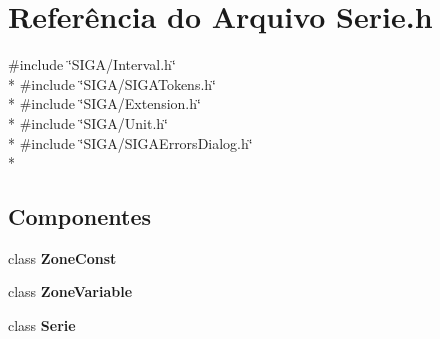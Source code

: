 \section{Referência do Arquivo Serie.\+h}
\label{_s_i_g_a_2_serie_8h}
{\ttfamily \#include \char`\"{}S\+I\+G\+A/\+Interval.\+h\char`\"{}}\\*
{\ttfamily \#include \char`\"{}S\+I\+G\+A/\+S\+I\+G\+A\+Tokens.\+h\char`\"{}}\\*
{\ttfamily \#include \char`\"{}S\+I\+G\+A/\+Extension.\+h\char`\"{}}\\*
{\ttfamily \#include \char`\"{}S\+I\+G\+A/\+Unit.\+h\char`\"{}}\\*
{\ttfamily \#include \char`\"{}S\+I\+G\+A/\+S\+I\+G\+A\+Errors\+Dialog.\+h\char`\"{}}\\*
\subsection*{Componentes}
\begin{DoxyCompactItemize}
\item 
class {\bf Zone\+Const}
\item 
class {\bf Zone\+Variable}
\item 
class {\bf Serie}
\end{DoxyCompactItemize}
